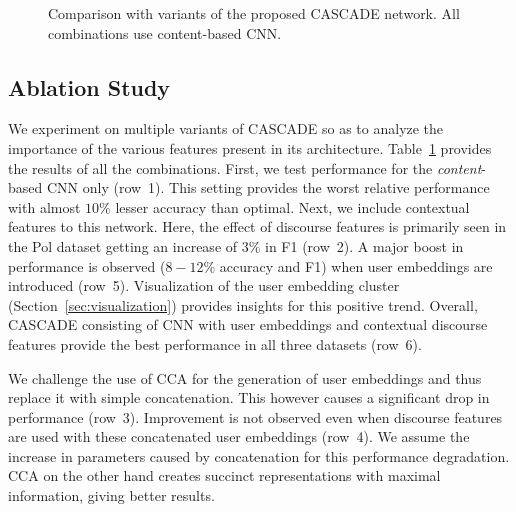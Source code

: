 \documentclass[11pt]{article}
\begin{document}
{\begin{figure}[b!]
\begin{floatrow}
{\begin{tabular}{l|c|c|c|c|c|c|c|c|r}
		\end{tabular}
  		\vspace{0.5cm}
  
}{\caption{\footnotesize{Comparison with variants of the proposed CASCADE network. All combinations use content-based CNN.}}\label{table:variationresults}
}

\end{floatrow}
\end{figure}

\subsection{Ablation Study} \label{sec:ablation}

We experiment on multiple variants of CASCADE so as to analyze the importance of the various features present in its architecture. Table~\ref{table:variationresults} provides the results of all the combinations. First, we test performance for the \textit{content}-based CNN only (row~1). This setting provides the worst relative performance with almost $10\%$ lesser accuracy than optimal. Next, we include contextual features to this network. Here, the effect of discourse features is primarily seen in the Pol dataset getting an increase of $3\%$ in F1 (row~2). A major boost in performance is observed ($8-12\%$ accuracy and F1) when user embeddings are introduced (row~5). Visualization of the user embedding cluster (Section~\ref{sec:visualization}) provides insights for this positive trend. Overall, CASCADE consisting of CNN with user embeddings and contextual discourse features provide the best performance in all three datasets (row~6).

We challenge the use of CCA for the generation of user embeddings and thus replace it with simple concatenation. This however causes a significant drop in performance (row~3). Improvement is not observed even when discourse features are used with these concatenated user embeddings (row~4). We assume the increase in parameters caused by concatenation for this performance degradation. CCA on the other hand creates succinct representations with maximal information, giving better results. 














}
\end{document}
